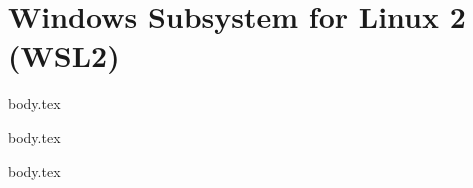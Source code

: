 \section{Windows Subsystem for Linux 2 (WSL2)}

\ifdefined\wslInstallation
{body.tex}
\fi

\ifdefined\wslDistro
{body.tex}
\fi

\ifdefined\wslRelevant
{body.tex}
\fi